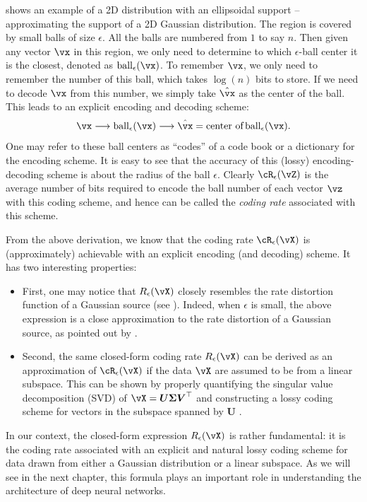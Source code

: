 \documentclass[../../book-main.tex]{subfiles}
\begin{document}
\begin{example}
     shows an example of a 2D distribution
    with an ellipsoidal support -- approximating the support of a 2D
    Gaussian distribution. The region is covered by small balls of
    size $\epsilon$. All the balls are numbered from $1$ to say $n$.
    Then given any vector $\vx$ in this region, we
    only need to determine to which $\epsilon$-ball center it is the
    closest, denoted as $\operatorname{ball}_{\epsilon}(\vx)$. To
    remember $\vx$, we only need to remember the number of this ball,
    which takes $\log(n)$ bits to store. If we need to decode $\vx$
    from this number, we simply take $\hat \vx$ as the center of the
    ball. This leads to an explicit encoding and decoding scheme:
    \begin{equation}
        \vx \longrightarrow \operatorname{ball}_{\epsilon}(\vx)
        \longrightarrow \hat \vx = \mbox{center of}
        \operatorname{ball}_{\epsilon}(\vx).
    \end{equation}
    One may refer to these ball centers as  ``codes'' of a code book
    or a dictionary for the encoding scheme. It is easy to see that
    the accuracy of this (lossy) encoding-decoding scheme is about
    the radius of the ball $\epsilon$.
    Clearly $\cR_{\epsilon}(\vZ)$ is the average
    number of bits required to encode the ball number of each vector $\vz$ with
    this coding scheme, and hence can be called the {\em coding rate}
    associated with this scheme.
\end{example}

From the above derivation, we know that the coding rate
$\cR_{\epsilon}(\vX)$ is (approximately) achievable with an explicit
encoding (and decoding) scheme. It has two interesting  properties:
\begin{itemize}
    \item First, one may notice that $R_{\epsilon}(\vX)$ closely
        resembles the rate distortion function of a Gaussian source
        \cite{Cover-Thomas} (see ). Indeed,
        when $\epsilon$ is small, the above expression is a close
        approximation to the rate distortion of a Gaussian source, as
        pointed out by   \cite{MaY2007-PAMI}.
    \item Second, the same closed-form coding rate $R_{\epsilon}(\vX)$
        can be derived as an approximation of \(\cR_{\epsilon}(\vX)\)
        if the data $\vX$ are assumed to be from a linear subspace.
        This can be shown by properly quantifying the singular value
        decomposition (SVD) of $\vX = \boldsymbol{U}
        \boldsymbol{\Sigma}\boldsymbol{V}^\top$ and constructing a
        lossy coding scheme for vectors in the subspace spanned by
        $\boldsymbol{U}$ \cite{MaY2007-PAMI}.
\end{itemize}
In our context, the closed-form expression $R_{\epsilon}(\vX)$ is
rather fundamental: it is the coding rate associated with an explicit
and natural lossy coding scheme for data drawn from either a Gaussian
distribution or a linear subspace. As we will see in the next
chapter, this formula plays an important role in understanding the
architecture of deep neural networks.
\end{document}
